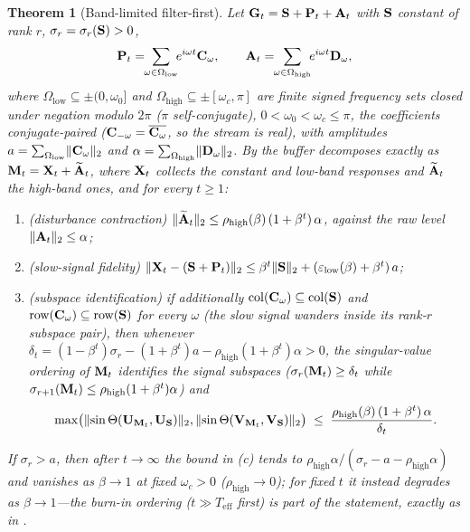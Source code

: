 \documentclass[11pt,a4paper]{article}
\newtheorem{theorem}{Theorem}
\theoremstyle{remark}
\newcommand{\Teff}{T_{\mathrm{eff}}}
\newcommand{\rhohigh}{\rho_{\mathrm{high}}}
\newcommand{\epslow}{\varepsilon_{\mathrm{low}}}
\begin{document}
\begin{theorem}[Band-limited filter-first]
\label{thm:bandlimited}
Let $\mathbf{G}_t=\mathbf{S}+\mathbf{P}_t+\mathbf{A}_t$ with $\mathbf{S}$ constant of rank $r$, $\sigma_r=\sigma_r(\mathbf{S})>0$,
\[
\Pbf_t=\!\!\sum_{\omega\in\Omega_{\mathrm{low}}}\!\!e^{i\omega t}\Cbf_\omega,\qquad
\Abf_t=\!\!\sum_{\omega\in\Omega_{\mathrm{high}}}\!\!e^{i\omega t}\Dbf_\omega,
\]
where $\Omega_{\mathrm{low}}\subseteq\pm(0,\omega_0]$ and $\Omega_{\mathrm{high}}\subseteq\pm[\omega_c,\pi]$ are finite signed frequency sets closed under negation modulo $2\pi$ ($\pi$ self-conjugate), $0<\omega_0<\omega_c\le\pi$, the coefficients conjugate-paired ($\mathbf{C}_{-\omega}=\overline{\mathbf{C}_\omega}$, so the stream is real), with amplitudes $a=\sum_{\Omega_{\mathrm{low}}}\lVert\mathbf{C}_\omega\rVert_2$ and $\alpha=\sum_{\Omega_{\mathrm{high}}}\lVert\mathbf{D}_\omega\rVert_2$.
By  the buffer decomposes exactly as $\mathbf{M}_t=\mathbf{X}_t+\widetilde{\mathbf{A}}_t$, where $\mathbf{X}_t$ collects the constant and low-band responses and $\widetilde{\mathbf{A}}_t$ the high-band ones, and for every $t\ge1$:
\begin{enumerate}
\item[(a)] (disturbance contraction) $\lVert\tilde\Abf_t\rVert_2\le\rhohigh(\beta)\,(1+\beta^t)\,\alpha$, against the raw level $\lVert\mathbf{A}_t\rVert_2\le\alpha$;
\item[(b)] (slow-signal fidelity) $\lVert\Xbf_t-(\Sbf+\Pbf_t)\rVert_2\le\beta^t\lVert\Sbf\rVert_2+(\epslow(\beta)+\beta^t)\,a$;
\item[(c)] (subspace identification) if additionally $\mathrm{col}(\mathbf{C}_\omega)\subseteq\mathrm{col}(\mathbf{S})$ and $\mathrm{row}(\mathbf{C}_\omega)\subseteq\mathrm{row}(\mathbf{S})$ for every $\omega$ (the slow signal wanders inside its rank-$r$ subspace pair), then whenever $\delta_t=(1-\beta^t)\sigma_r-(1+\beta^t)a-\rhohigh(1+\beta^t)\alpha>0$, the singular-value ordering of $\mathbf{M}_t$ identifies the signal subspaces ($\sigma_r(\mathbf{M}_t)\ge\delta_t$ while $\sigma_{r+1}(\Mbf_t)\le\rhohigh(1+\beta^t)\alpha$) and
  \[
  \max\bigl(\lVert\sin\Theta(\Ubf_{\Mbf_t},\Ubf_{\Sbf})\rVert_2,\lVert\sin\Theta(\Vbf_{\Mbf_t},\Vbf_{\Sbf})\rVert_2\bigr)
  \;\le\;\frac{\rhohigh(\beta)\,(1+\beta^t)\,\alpha}{\delta_t}.
  \]
\end{enumerate}
If $\sigma_r>a$, then after $t\to\infty$ the bound in (c) tends to $\rhohigh\alpha/(\sigma_r-a-\rhohigh\alpha)$ and vanishes as $\beta\to1$ at fixed $\omega_c>0$ ($\rhohigh\to0$); for fixed $t$ it instead degrades as $\beta\to1$---the burn-in ordering ($t\gg\Teff$ first) is part of the statement, exactly as in .
\end{theorem}
\end{document}
